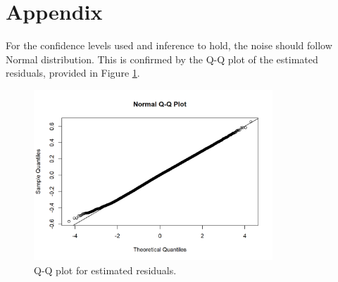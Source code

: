 \documentclass[12pt]{article}
\begin{document}
\appendix

\section*{Appendix}

For the confidence levels used and inference to hold,
the noise should follow Normal distribution.
This is confirmed by the Q-Q plot of the estimated residuals,
provided in Figure \ref{qq}.

\begin{figure}[hb]
	\centering
	\includegraphics[width = 0.8\textwidth]
	{../figure/Image.png}
	\caption{
		Q-Q plot for estimated residuals.
	}
	\label{qq}
\end{figure}
\end{document}
